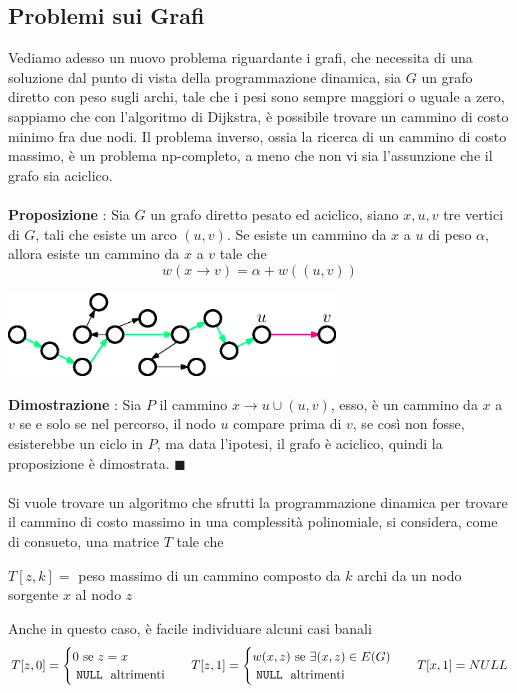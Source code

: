 \documentclass[12pt, letterpaper]{article}
\newcommand{\codee}[1]{\colorbox{white}{\texttt{#1}}}
\newcommand{\acc}{\\\hphantom{}\\}
\begin{document}
\subsection{Problemi sui Grafi}\label{dinamicaGrafi}
Vediamo adesso un nuovo problema riguardante i grafi, che necessita di una soluzione dal punto di vista della programmazione
dinamica, sia $G$ un grafo diretto con peso sugli archi, tale che i pesi sono sempre maggiori o uguale a zero, sappiamo che
con l'algoritmo di Dijkstra, è possibile trovare un cammino di costo minimo fra due nodi. Il problema inverso, ossia la ricerca
di un cammino di costo massimo, è un problema np-completo, a meno che non vi sia l'assunzione che il grafo sia aciclico.\acc
\textbf{Proposizione} : Sia $G$ un grafo diretto pesato ed aciclico, siano $x,u,v$ tre vertici di $G$, tali che esiste
un arco $(u,v)$. Se esiste un cammino da $x$ a $u$ di peso $\alpha$, allora esiste un cammino da $x$ a $v$ tale che
$$ w(x\rightarrow v)=\alpha + w((u,v))$$ \begin{center}
    \includegraphics[width=0.65\textwidth ]{images/cammCostoMax.eps}
\end{center}
\textbf{Dimostrazione} : Sia $P$ il cammino $x\rightarrow u \cup (u,v)$, esso, è un cammino da $x$ a $v$ se e solo
se nel percorso, il nodo $u$ compare prima di $v$, se così non fosse, esisterebbe un ciclo in $P$, ma data l'ipotesi,
il grafo è aciclico, quindi la proposizione è dimostrata. $\blacksquare$\acc
Si vuole trovare un algoritmo che sfrutti la programmazione dinamica per trovare il cammino di costo massimo in una complessità
polinomiale, si considera, come di consueto, una matrice $T$ tale che\begin{center}
    $T[z,k]=$ peso massimo di un cammino composto da $k$ archi da un nodo sorgente $x$ al nodo $z$
\end{center}
Anche in questo caso, è facile individuare alcuni casi banali
$$ T[z,0]=\begin{cases}
        0\text{ se }z=x \\
        \text{\codee{NULL} altrimenti}
    \end{cases}\;\;\;T[z,1]=\begin{cases}
        w(x,z)\text{ se }\exists (x,z)\in E(G) \\
        \text{\codee{NULL} altrimenti}
    \end{cases}\;\;\;T[x,1]=NULL$$
\end{document}
